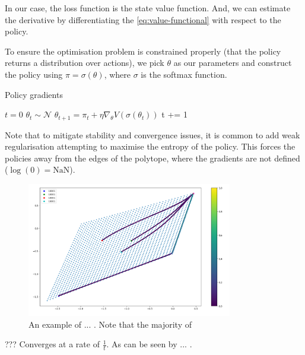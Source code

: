 In our case, the loss function is the state value function. And, we can estimate the derivative
by differentiating the \ref{eq:value-functional} with respect to the policy.

To ensure the optimisation problem is constrained properly (that the policy returns a distribution over actions),
we pick $\theta$ as our parameters and construct the policy using $\pi = \sigma(\theta)$, where $\sigma$ is the softmax function.

\begin{algorithm}
\caption{Policy gradients}
\begin{algorithmic}[1]

  \State $t=0$
  \State $\theta_t \sim \mathcal N$ 
    \State $\theta_{t+1} = \pi_t + \eta \nabla_{\theta} V(\sigma(\theta_t))$ 
    \State t += 1
  \EndWhile
  \State {}
\EndProcedure

\end{algorithmic}
\end{algorithm}

Note that to mitigate stability and convergence issues, it is common to add weak regularisation
attempting to maximise the entropy of the policy. This forces the policies away
from the edges of the polytope, where the gradients are not defined ($\log(0) = \text{NaN}$).

\begin{figure}[h!]
\centering
\includegraphics[width=0.8\textwidth,height=0.4\textheight]{../../pictures/figures/pg-polytope.png}
\caption{An example of ... . Note that the majority of }
\end{figure}

{\color{red}??? Converges at a rate of $\frac{1}{t}$. As can be seen by ...}
\cite{Agarwal2019a}.

